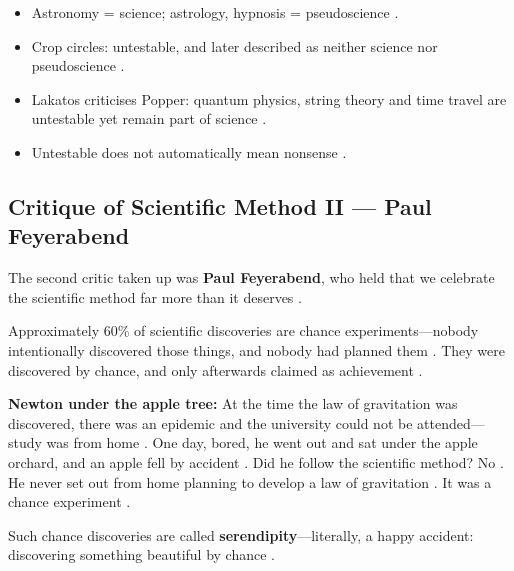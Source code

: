 \begin{QuickRevision}
\begin{itemize}
    \item Astronomy = science; astrology, hypnosis = pseudoscience .
    \item Crop circles: untestable, and later described as neither science nor pseudoscience .
    \item Lakatos criticises Popper: quantum physics, string theory and time travel are untestable yet remain part of science .
    \item Untestable does not automatically mean nonsense .
\end{itemize}
\end{QuickRevision}

\subsection{Critique of Scientific Method II --- Paul Feyerabend}
The second critic taken up was \textbf{Paul Feyerabend}, who held that we celebrate the scientific method far more than it deserves .

\begin{DataFact}
Approximately 60\% of scientific discoveries are chance experiments---nobody intentionally discovered those things, and nobody had planned them . They were discovered by chance, and only afterwards claimed as achievement .
\end{DataFact}

\begin{ExampleBox}
\textbf{Newton under the apple tree:} At the time the law of gravitation was discovered, there was an epidemic and the university could not be attended---study was from home . One day, bored, he went out and sat under the apple orchard, and an apple fell by accident . Did he follow the scientific method? No . He never set out from home planning to develop a law of gravitation . It was a chance experiment .
\end{ExampleBox}

\begin{KeyConcept}
Such chance discoveries are called \textbf{serendipity}---literally, a happy accident: discovering something beautiful by chance .
\end{KeyConcept}

